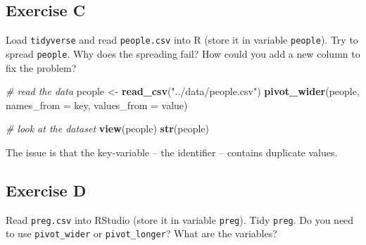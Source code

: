 \documentclass[
]{article}
\newenvironment{Shaded}{\begin{snugshade}}{\end{snugshade}}
\newcommand{\CommentTok}[1]{\textcolor[rgb]{0.56,0.35,0.01}{\textit{#1}}}
\newcommand{\DataTypeTok}[1]{\textcolor[rgb]{0.13,0.29,0.53}{#1}}
\newcommand{\DecValTok}[1]{\textcolor[rgb]{0.00,0.00,0.81}{#1}}
\newcommand{\KeywordTok}[1]{\textcolor[rgb]{0.13,0.29,0.53}{\textbf{#1}}}
\newcommand{\NormalTok}[1]{#1}
\newcommand{\OperatorTok}[1]{\textcolor[rgb]{0.81,0.36,0.00}{\textbf{#1}}}
\newcommand{\StringTok}[1]{\textcolor[rgb]{0.31,0.60,0.02}{#1}}
\begin{document}
\hypertarget{exercise-c}{%
\subsection{Exercise C}\label{exercise-c}}

Load \texttt{tidyverse} and read \texttt{people.csv} into R (store it in
variable \texttt{people}). Try to spread \texttt{people}. Why does the
spreading fail? How could you add a new column to fix the problem?

\begin{Shaded}
\begin{Highlighting}[]
\CommentTok{\# read the data}
\NormalTok{people \textless{}{-}}\StringTok{ }\KeywordTok{read\_csv}\NormalTok{(}\StringTok{"../data/people.csv"}\NormalTok{)}
\KeywordTok{pivot\_wider}\NormalTok{(people, }\DataTypeTok{names\_from =}\NormalTok{ key, }\DataTypeTok{values\_from =}\NormalTok{  value)}

\CommentTok{\# look at the dataset}
\KeywordTok{view}\NormalTok{(people)}
\KeywordTok{str}\NormalTok{(people)}
\end{Highlighting}
\end{Shaded}

The issue is that the key-variable -- the identifier -- contains
duplicate values.

\begin{Shaded}
\end{Shaded}

\hypertarget{exercise-d}{%
\subsection{Exercise D}\label{exercise-d}}

Read \texttt{preg.csv} into RStudio (store it in variable
\texttt{preg}). Tidy \texttt{preg}. Do you need to use
\texttt{pivot\_wider} or \texttt{pivot\_longer}? What are the variables?
\end{document}
